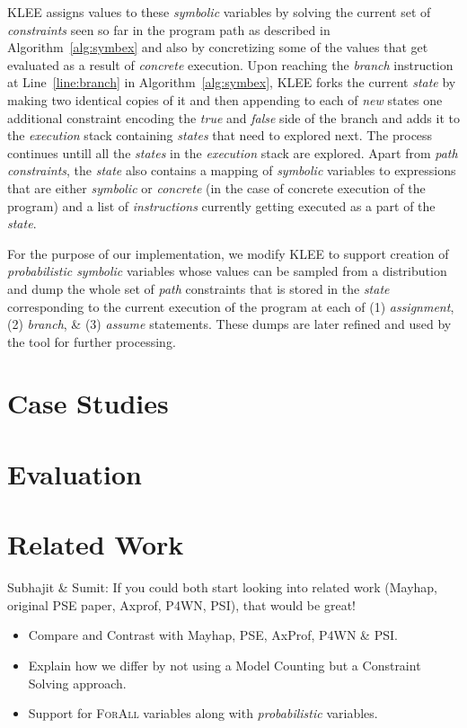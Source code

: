 \documentclass[acmsmall]{acmart}\settopmatter{}
\begin{document}
	\textsc{KLEE} assigns values to these \textit{symbolic} variables by solving the current set of \textit{constraints} seen so far in the program path as described in Algorithm~\ref{alg:symbex} and also by concretizing some of the values that get evaluated as a result of \textit{concrete} execution. Upon reaching the \textit{branch} instruction at Line~\ref{line:branch} in Algorithm~\ref{alg:symbex}, \textsc{KLEE} forks the current \textit{state} by making two identical copies of it and then appending to each of \textit{new} states one additional constraint encoding the \textit{true} and \textit{false} side of the branch and adds it to the \textit{execution} stack containing \textit{states} that need to explored next. The process continues untill all the \textit{states} in the \textit{execution} stack are explored. Apart from \textit{path constraints}, the \textit{state} also contains a mapping of \textit{symbolic} variables to expressions that are either  \textit{symbolic} or \textit{concrete} (in the case of concrete execution of the program) and a list of \textit{instructions} currently getting executed as a part of the \textit{state}.	
	
	For the purpose of our implementation, we modify \textsc{KLEE} to support creation of \textit{probabilistic symbolic} variables whose values can be sampled from a distribution and dump the whole set of \textit{path} constraints that is stored in the \textit{state} corresponding to the current execution of the program at each of (1) \textit{assignment}, (2) \textit{branch}, \& (3) \textit{assume} statements. These dumps are later refined and used by the tool for further processing.
	\section{Case Studies}
	\label{sec:case_studies}
	
	\section{Evaluation}
	\label{sec:eval}
	
	\section{Related Work}
	\label{sec:related}
	{\color{red} Subhajit \& Sumit: If you could both start looking into related work (Mayhap, original PSE paper, Axprof, P4WN, PSI), that would be great!}
	\begin{itemize}
		\item Compare and Contrast with Mayhap, PSE, AxProf, P4WN \& PSI.
		\item Explain how we differ by not using a Model Counting but a Constraint Solving approach.
		\item Support for \textsc{ForAll} variables along with \textit{probabilistic} variables. 
	\end{itemize}
\end{document}
